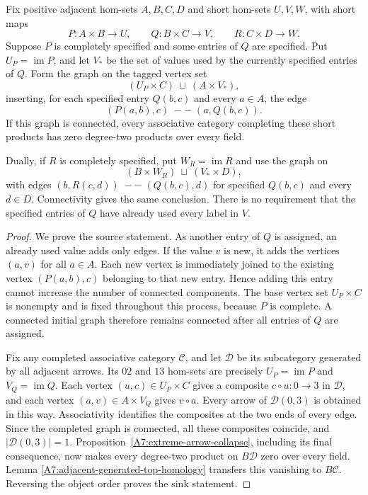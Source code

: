 \begin{proposition}
\label{A7:generated-partial-long-graph}
Fix positive adjacent hom-sets $A,B,C,D$ and short hom-sets
$U,V,W$, with short maps
\[
 P:A\times B\longrightarrow U,\qquad
 Q:B\times C\longrightarrow V,\qquad
 R:C\times D\longrightarrow W.
\]
Suppose $P$ is completely specified and some entries of $Q$
are specified. Put $U_P=\operatorname{im}P$, and let $V_*$
be the set of values used by the currently specified entries
of $Q$.  Form the graph on the tagged vertex set
\[
 (U_P\times C)\ \sqcup\ (A\times V_*),
\]
inserting, for each specified entry $Q(b,c)$ and every $a\in A$,
the edge
\[
 (P(a,b),c)\;--\;(a,Q(b,c)).
\]
If this graph is connected, every associative category
completing these short products has zero degree-two products
over every field.

Dually, if $R$ is completely specified, put
$W_R=\operatorname{im}R$ and use the graph on
\[
 (B\times W_R)\ \sqcup\ (V_*\times D),
\]
with edges $(b,R(c,d))\;--\;(Q(b,c),d)$ for specified
$Q(b,c)$ and every $d\in D$.  Connectivity gives the same
conclusion. There is no requirement that the specified
entries of $Q$ have already used every label in $V$.
\end{proposition}
\begin{proof}
We prove the source statement.  As another entry of $Q$ is
assigned, an already used value adds only edges.  If the value
$v$ is new, it adds the vertices $(a,v)$ for all $a\in A$.
Each new vertex is immediately joined to the existing vertex
$(P(a,b),c)$ belonging to that new entry.  Hence adding this
entry cannot increase the number of connected components.
The base vertex set $U_P\times C$ is nonempty and is fixed
throughout this process, because $P$ is complete.  A connected
initial graph therefore remains connected after all entries
of $Q$ are assigned.

Fix any completed associative category $\mathcal C$, and let
$\mathcal D$ be its subcategory generated by all adjacent
arrows. Its $02$ and $13$ hom-sets are precisely
$U_P=\operatorname{im}P$ and $V_Q=\operatorname{im}Q$.
Each vertex $(u,c)\in U_P\times C$ gives a composite
$c\circ u:0\to3$ in $\mathcal D$, and each vertex
$(a,v)\in A\times V_Q$ gives $v\circ a$.
Every arrow of $\mathcal D(0,3)$ is obtained in this way.
Associativity identifies the composites at the two ends
of every edge. Since the completed graph is connected,
all these composites coincide, and
$|\mathcal D(0,3)|=1$.
Proposition~\ref{A7:extreme-arrow-collapse}, including its
final consequence, now makes every degree-two product on
$B\mathcal D$ zero over every field.  Lemma
\ref{A7:adjacent-generated-top-homology} transfers this
vanishing to $B\mathcal C$.
Reversing the object order proves the sink statement.
\end{proof}

